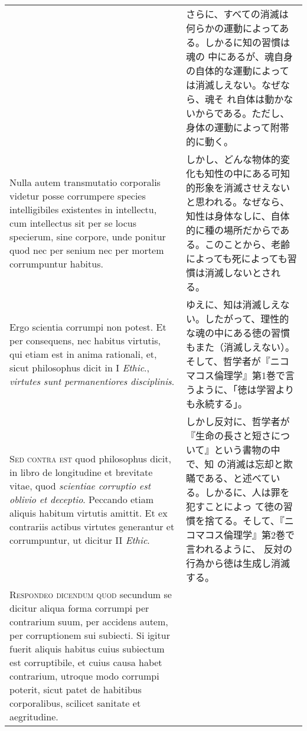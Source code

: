 \documentclass[10pt]{jsarticle} %
\begin{document}
\begin{longtable}{p{21em}p{21em}}
&

さらに、すべての消滅は何らかの運動によってある。しかるに知の習慣は魂の
中にあるが、魂自身の自体的な運動によっては消滅しえない。なぜなら、魂そ
れ自体は動かないからである。ただし、身体の運動によって附帯的に動く。


\\


Nulla autem transmutatio corporalis
videtur posse corrumpere species intelligibiles existentes in
intellectu, cum intellectus sit per se locus specierum, sine corpore,
unde ponitur quod nec per senium nec per mortem corrumpuntur
habitus. 

&

しかし、どんな物体的変化も知性の中にある可知的形象を消滅させえないと思われる。なぜなら、知性は身体なしに、自体的に種の場所だからである。このことから、老齢によっても死によっても習慣は消滅しないとされる。

\\


Ergo scientia corrumpi non potest. Et per consequens, nec
habitus virtutis, qui etiam est in anima rationali, et, sicut
philosophus dicit in I {\itshape Ethic}., {\itshape virtutes sunt permanentiores
disciplinis}.


&


ゆえに、知は消滅しえない。したがって、理性的な魂の中にある徳の習慣もまた（消滅しえない）。そして、哲学者が『ニコマコス倫理学』第1巻で言うように、「徳は学習よりも永続する」。

\\



{\scshape Sed contra est} quod philosophus dicit, in libro de longitudine et
brevitate vitae, quod {\itshape scientiae corruptio est oblivio et
deceptio}. Peccando etiam aliquis habitum virtutis amittit. Et ex
contrariis actibus virtutes generantur et corrumpuntur, ut dicitur II
{\itshape Ethic}.


&

しかし反対に、哲学者が『生命の長さと短さについて』という書物の中で、知
の消滅は忘却と欺瞞である、と述べている。しかるに、人は罪を犯すことによっ
て徳の習慣を捨てる。そして、『ニコマコス倫理学』第2巻で言われるように、
反対の行為から徳は生成し消滅する。


\\

{\scshape Respondeo dicendum quod} secundum se dicitur aliqua forma corrumpi per
contrarium suum, per accidens autem, per corruptionem sui subiecti. Si
igitur fuerit aliquis habitus cuius subiectum est corruptibile, et
cuius causa habet contrarium, utroque modo corrumpi poterit, sicut
patet de habitibus corporalibus, scilicet sanitate et
aegritudine. 



\end{longtable}
\end{document}
